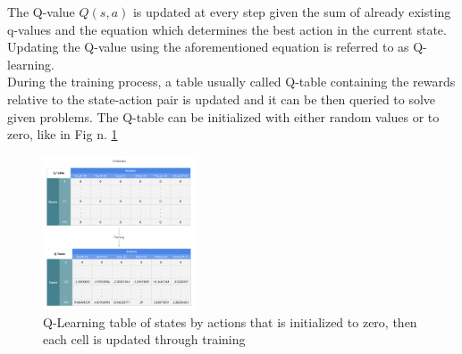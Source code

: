 \documentclass[conference]{IEEEtran}
\begin{document}
The Q-value $Q(s,a)$ is updated at every step given the sum of already existing q-values and the equation which determines the best action in the current state. Updating the Q-value using the aforementioned equation is referred to as Q-learning.\cite{Q_learning}\\
During the training process, a table usually called Q-table containing the rewards relative to the state-action pair is updated and it can be then queried to solve given problems. The Q-table can be initialized with either random values or to zero, like in Fig n. \ref{fig:q_table}
\begin{figure}[htb]
    \centering
    \includegraphics[width=0.4\textwidth]{img/Q-Learning_Matrix_Initialized_and_After_Training.png}
    \caption{Q-Learning table of states by actions that is initialized to zero, then each cell is updated through training\cite{enwiki:1054401845} 
    } 
    \label{fig:q_table}
\end{figure}
\end{document}
